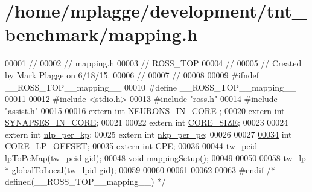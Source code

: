 \hypertarget{mapping_8h_source}{}\section{/home/mplagge/development/tnt\+\_\+benchmark/mapping.h}

\begin{DoxyCode}
00001 \textcolor{comment}{//}
00002 \textcolor{comment}{//  mapping.h}
00003 \textcolor{comment}{//  ROSS\_TOP}
00004 \textcolor{comment}{//}
00005 \textcolor{comment}{//  Created by Mark Plagge on 6/18/15.}
00006 \textcolor{comment}{//}
00007 \textcolor{comment}{//}
00008 
00009 \textcolor{preprocessor}{#ifndef \_\_ROSS\_TOP\_\_mapping\_\_}
00010 \textcolor{preprocessor}{#define \_\_ROSS\_TOP\_\_mapping\_\_}
00011 
00012 \textcolor{preprocessor}{#include <stdio.h>}
00013 \textcolor{preprocessor}{#include "ross.h"}
00014 \textcolor{preprocessor}{#include "\hyperlink{assist_8h}{assist.h}"}
00015 
00016 \textcolor{keyword}{extern} \textcolor{keywordtype}{int} \hyperlink{mapping_8h_a67e8e45768f76b984a60fcff2b7c51aa}{NEURONS\_IN\_CORE} ;
00020 \textcolor{keyword}{extern} \textcolor{keywordtype}{int} \hyperlink{mapping_8h_a076b99099b46431255982b2bb8ce06fb}{SYNAPSES\_IN\_CORE};
00021 
00022 \textcolor{keyword}{extern} \textcolor{keywordtype}{int} \hyperlink{mapping_8h_ad39b86a0b748731175572436f6672264}{CORE\_SIZE};
00023 
00024 \textcolor{keyword}{extern} \textcolor{keywordtype}{int} \hyperlink{mapping_8h_afe9ee9518533aa222adff4a27ff09281}{nlp\_per\_kp};
00025 \textcolor{keyword}{extern} \textcolor{keywordtype}{int} \hyperlink{mapping_8h_a929a1afa1773005b4881bea7869fdb60}{nkp\_per\_pe};
00026 
00027 
\hypertarget{mapping_8h_source_l00034}{}\hyperlink{mapping_8h_ae2910f7a5d9f53ae602e62bb0248edba}{00034} \textcolor{keywordtype}{int} \hyperlink{mapping_8h_ae2910f7a5d9f53ae602e62bb0248edba}{CORE\_LP\_OFFSET};
00035 \textcolor{keyword}{extern} \textcolor{keywordtype}{int} \hyperlink{mapping_8h_a1d3b60109ac1c91025d512707a3242a8}{CPE};
00036 
00044 tw\_peid \hyperlink{mapping_8h_ab67eefe1d34d874bcd5f8cfa854e7fc7}{lpToPeMap}(tw\_peid gid);
00048 \textcolor{keywordtype}{void} \hyperlink{mapping_8h_af6a8846083f1bd8ca747136c3b5967d8}{mappingSetup}();
00049 
00050 
00058 tw\_lp * \hyperlink{mapping_8h_a65ae45764256c6f8a0552ec04a132fcf}{globalToLocal}(tw\_lpid gid);
00059 
00060 
00061 
00062 
00063 \textcolor{preprocessor}{#endif }\textcolor{comment}{/* defined(\_\_ROSS\_TOP\_\_mapping\_\_) */}\textcolor{preprocessor}{}
\end{DoxyCode}

